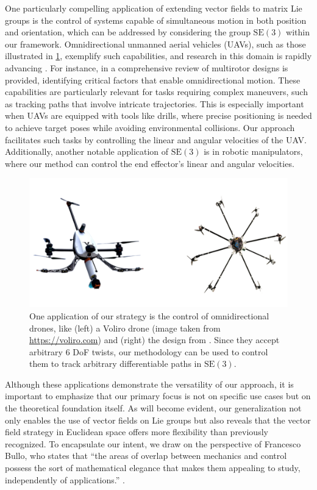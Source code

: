 One particularly compelling application of extending vector fields to matrix Lie groups is the control of systems capable of simultaneous motion in both position and orientation, which can be addressed by considering the group $\text{SE}(3)$ within our framework. Omnidirectional unmanned aerial vehicles (UAVs), such as those illustrated in \cref{fig:omnidirectionaldrone}, exemplify such capabilities, and research in this domain is rapidly advancing \citep{kamel2018voliro,Aboudorra2023,HamandiOmni}. For instance, in \citet{hamandi2021design} a comprehensive review of multirotor designs is provided, identifying critical factors that enable omnidirectional motion. These capabilities are particularly relevant for tasks requiring complex maneuvers, such as tracking paths that involve intricate trajectories. This is especially important when UAVs are equipped with tools like drills, where precise positioning is needed to achieve target poses while avoiding environmental collisions. Our approach facilitates such tasks by controlling the linear and angular velocities of the UAV. Additionally, another notable application of $\text{SE}(3)$ is in robotic manipulators, where our method can control the end effector's linear and angular velocities.
\begin{figure}[ht]
    \centering
    \includegraphics[width=.8\columnwidth]{figures/example_omnidirecitonal_wobg.png}
    \caption{One application of our strategy is the control of omnidirectional drones, like (left) a Voliro drone (image taken from \url{https://voliro.com}) and (right) the design from \citet{HamandiOmni}. Since they accept arbitrary $6$ DoF twists, our methodology can be used to control them to track arbitrary differentiable paths in $\text{SE}(3)$.}
    \label{fig:omnidirectionaldrone}
\end{figure}

Although these applications demonstrate the versatility of our approach, it is important to emphasize that our primary focus is not on specific use cases but on the theoretical foundation itself. As will become evident, our generalization not only enables the use of vector fields on Lie groups but also reveals that the vector field strategy in Euclidean space offers more flexibility than previously recognized. To encapsulate our intent, we draw on the perspective of Francesco Bullo, who states that ``the areas of overlap between mechanics and control possess the sort of mathematical elegance that makes them appealing to study, independently of applications.'' \citep{Bullo2004}.

